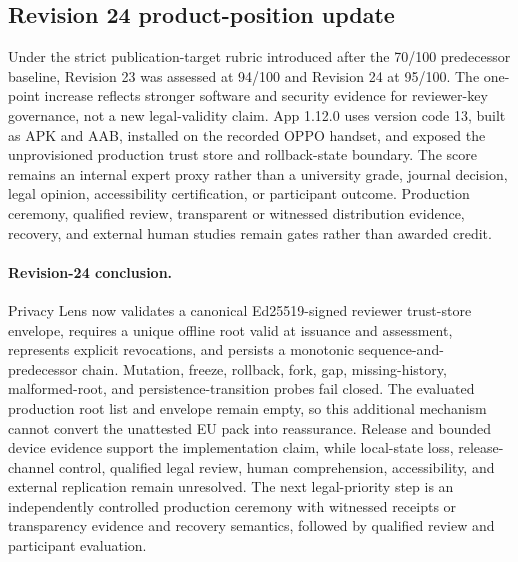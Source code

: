 

\subsection{Revision 24 product-position update}

Under the strict publication-target rubric introduced after the 70/100 predecessor baseline, Revision 23 was assessed at 94/100 and Revision 24 at 95/100. The one-point increase reflects stronger software and security evidence for reviewer-key governance, not a new legal-validity claim. App 1.12.0 uses version code 13, built as APK and AAB, installed on the recorded OPPO handset, and exposed the unprovisioned production trust store and rollback-state boundary. The score remains an internal expert proxy rather than a university grade, journal decision, legal opinion, accessibility certification, or participant outcome. Production ceremony, qualified review, transparent or witnessed distribution evidence, recovery, and external human studies remain gates rather than awarded credit.

\paragraph{Revision-24 conclusion.} Privacy Lens now validates a canonical Ed25519-signed reviewer trust-store envelope, requires a unique offline root valid at issuance and assessment, represents explicit revocations, and persists a monotonic sequence-and-predecessor chain. Mutation, freeze, rollback, fork, gap, missing-history, malformed-root, and persistence-transition probes fail closed. The evaluated production root list and envelope remain empty, so this additional mechanism cannot convert the unattested EU pack into reassurance. Release and bounded device evidence support the implementation claim, while local-state loss, release-channel control, qualified legal review, human comprehension, accessibility, and external replication remain unresolved. The next legal-priority step is an independently controlled production ceremony with witnessed receipts or transparency evidence and recovery semantics, followed by qualified review and participant evaluation.
